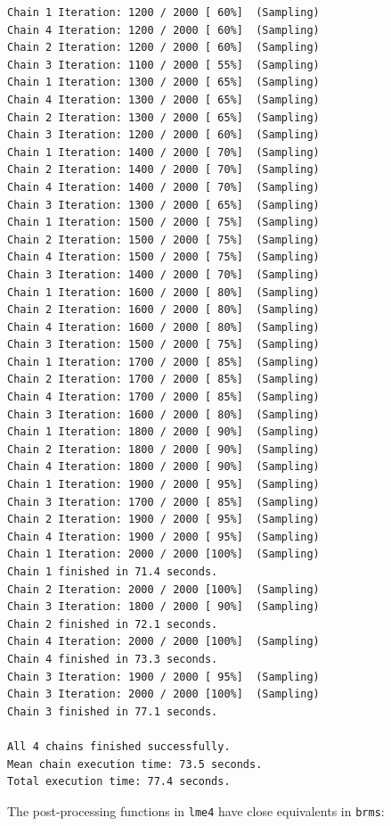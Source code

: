 \documentclass[
  13,
  letterpaper,
]{report}
\begin{document}
\begin{verbatim}
Chain 1 Iteration: 1200 / 2000 [ 60%]  (Sampling) 
Chain 4 Iteration: 1200 / 2000 [ 60%]  (Sampling) 
Chain 2 Iteration: 1200 / 2000 [ 60%]  (Sampling) 
Chain 3 Iteration: 1100 / 2000 [ 55%]  (Sampling) 
Chain 1 Iteration: 1300 / 2000 [ 65%]  (Sampling) 
Chain 4 Iteration: 1300 / 2000 [ 65%]  (Sampling) 
Chain 2 Iteration: 1300 / 2000 [ 65%]  (Sampling) 
Chain 3 Iteration: 1200 / 2000 [ 60%]  (Sampling) 
Chain 1 Iteration: 1400 / 2000 [ 70%]  (Sampling) 
Chain 2 Iteration: 1400 / 2000 [ 70%]  (Sampling) 
Chain 4 Iteration: 1400 / 2000 [ 70%]  (Sampling) 
Chain 3 Iteration: 1300 / 2000 [ 65%]  (Sampling) 
Chain 1 Iteration: 1500 / 2000 [ 75%]  (Sampling) 
Chain 2 Iteration: 1500 / 2000 [ 75%]  (Sampling) 
Chain 4 Iteration: 1500 / 2000 [ 75%]  (Sampling) 
Chain 3 Iteration: 1400 / 2000 [ 70%]  (Sampling) 
Chain 1 Iteration: 1600 / 2000 [ 80%]  (Sampling) 
Chain 2 Iteration: 1600 / 2000 [ 80%]  (Sampling) 
Chain 4 Iteration: 1600 / 2000 [ 80%]  (Sampling) 
Chain 3 Iteration: 1500 / 2000 [ 75%]  (Sampling) 
Chain 1 Iteration: 1700 / 2000 [ 85%]  (Sampling) 
Chain 2 Iteration: 1700 / 2000 [ 85%]  (Sampling) 
Chain 4 Iteration: 1700 / 2000 [ 85%]  (Sampling) 
Chain 3 Iteration: 1600 / 2000 [ 80%]  (Sampling) 
Chain 1 Iteration: 1800 / 2000 [ 90%]  (Sampling) 
Chain 2 Iteration: 1800 / 2000 [ 90%]  (Sampling) 
Chain 4 Iteration: 1800 / 2000 [ 90%]  (Sampling) 
Chain 1 Iteration: 1900 / 2000 [ 95%]  (Sampling) 
Chain 3 Iteration: 1700 / 2000 [ 85%]  (Sampling) 
Chain 2 Iteration: 1900 / 2000 [ 95%]  (Sampling) 
Chain 4 Iteration: 1900 / 2000 [ 95%]  (Sampling) 
Chain 1 Iteration: 2000 / 2000 [100%]  (Sampling) 
Chain 1 finished in 71.4 seconds.
Chain 2 Iteration: 2000 / 2000 [100%]  (Sampling) 
Chain 3 Iteration: 1800 / 2000 [ 90%]  (Sampling) 
Chain 2 finished in 72.1 seconds.
Chain 4 Iteration: 2000 / 2000 [100%]  (Sampling) 
Chain 4 finished in 73.3 seconds.
Chain 3 Iteration: 1900 / 2000 [ 95%]  (Sampling) 
Chain 3 Iteration: 2000 / 2000 [100%]  (Sampling) 
Chain 3 finished in 77.1 seconds.

All 4 chains finished successfully.
Mean chain execution time: 73.5 seconds.
Total execution time: 77.4 seconds.
\end{verbatim}

The post-processing functions in \texttt{lme4} have close equivalents in
\texttt{brms}:
\end{document}
